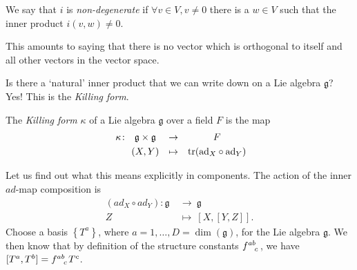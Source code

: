 \begin{definition}[]
  We say that $i$ is \emph{non-degenerate} if $\forall v \in V, v \neq 0$ there is a $w \in V$ such that the inner product $i(v, w) \neq 0$.
\end{definition}
\begin{leftbar}
  \begin{remark}
    This amounts to saying that there is no vector which is orthogonal to itself and all other vectors in the vector space.
  \end{remark}
\end{leftbar}
Is there a `natural' inner product that we can write down on a Lie algebra $\mathfrak{g}$?
Yes! This is the \emph{Killing form}.
\begin{definition}[]
  The \emph{Killing form} $\kappa$ of a Lie algebra $\mathfrak{g}$ over a field $F$ is the map
  \begin{equation}
    \begin{gathered}
      \kappa \colon \\
      \qquad
    \end{gathered}
    \begin{gathered}
      \mathfrak{g} \times \mathfrak{g} \\
      (X, Y)
    \end{gathered}
    \quad
    \begin{gathered}
      \to \\
      \mapsto
    \end{gathered}
    \quad
    \begin{gathered}
      F \\
      \tr(\text{ad}_{X} \circ \text{ad} _{Y})
    \end{gathered}
  \end{equation}
\end{definition}
Let us find out what this means explicitly in components.
The action of the inner $ad$-map composition is
\begin{equation}
  \begin{split}
    (ad_X \circ ad_Y) \colon \mathfrak{g} \ &\to\  \mathfrak{g} \\
    Z \ &\mapsto\  [X,[Y, Z]].
  \end{split}
\end{equation}
Choose a basis $\left\{ T^a \right\}$, where $a = 1, \dots, D=\dim(\mathfrak{g})$, for the Lie algebra $\mathfrak{g}$. 
We then know that by definition of the structure constants $f \indices{^{ab}_c}$, we have $[T^a, T^b] = f \indices{^{ab}_c} T^c$.
